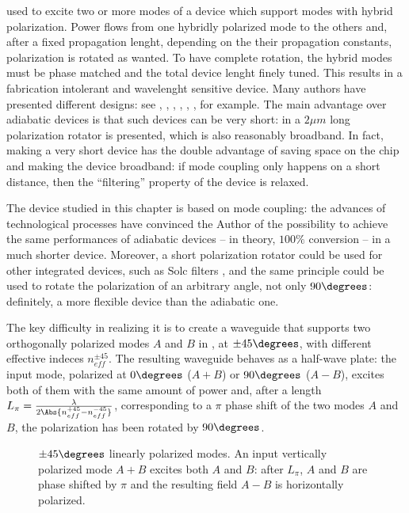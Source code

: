\begin{description}
  used to excite two or more modes of a device which support modes
  with hybrid polarization. Power flows from one hybridly polarized
  mode to the others and, after a fixed propagation lenght, depending
  on the their propagation constants, polarization is rotated as
  wanted. To have complete rotation, the hybrid modes must be phase
  matched and the total device lenght finely tuned. This results in a
  fabrication intolerant and wavelenght sensitive device. Many authors
  have presented different designs: see \cite{huang}, \cite{tzolov},
  \cite{lui}, \cite{kotlyar_compact}, \cite{correia_genetic},
  \cite{elrefaei_slanted}, for example. The main advantage over
  adiabatic devices is that such devices can be very short: in
  \cite{kotlyar_compact} a $2 \mu m$ long polarization rotator is
  presented, which is also reasonably broadband. In fact, making a
  very short device has the double advantage of saving space on the
  chip and making the device broadband: if mode coupling only happens
  on a short distance, then the ``filtering'' property of the device
  is relaxed.
\end{description}

The device studied in this chapter is based on mode coupling: the
advances of technological processes have convinced the Author of the
possibility to achieve the same performances of adiabatic devices --
in theory, $100\%$ conversion -- in a much shorter device. Moreover, a
short polarization rotator could be used for other integrated devices,
such as Solc filters \cite{solc}, and the same principle could be used
to rotate the polarization of an arbitrary angle, not only
$90\degrees$: definitely, a more flexible device than the adiabatic
one.

The key difficulty in realizing it is to create a waveguide that
supports two orthogonally polarized modes $A$ and $B$ in
, at $\pm 45\degrees$, with different
effective indeces $n_{eff}^{\pm 45}$. The resulting waveguide behaves
as a half-wave plate: the input mode, polarized at $0\degrees$ ($A+B$)
or $90\degrees$ ($A - B$), excites both of them with the same amount
of power and, after a length $L_\pi =
\frac{\lambda}{2\Abs{n_{eff}^{+45} - n_{eff}^{-45}}}$, corresponding
to a $\pi$ phase shift of the two modes $A$ and $B$, the polarization
has been rotated by $90\degrees$.

\begin{figure}[htbp]
  \begin{center}
    \resizebox{5cm}{!}{}
  \end{center}
  \caption{$\pm45\degrees$ linearly polarized modes. An input
    vertically polarized mode $A+B$ excites both $A$ and $B$: after
    $L_\pi$, $A$ and $B$ are phase shifted by $\pi$ and the resulting
    field $A - B$ is horizontally polarized.}
  \label{fig:polrot_modes}
\end{figure}

